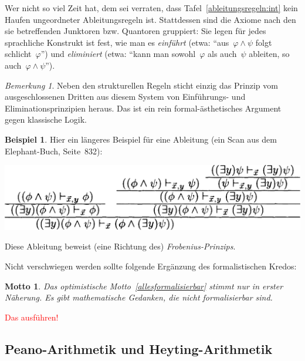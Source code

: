 \documentclass[a4paper,ngerman,12pt]{scrartcl}
\theoremstyle{definition}
\newtheorem{bsp}[defn]{Beispiel}
\theoremstyle{plain}
\newtheorem{motto}[defn]{Motto}
\theoremstyle{remark}
\newtheorem{bem}[defn]{Bemerkung}
\renewcommand{\_}{\mathpunct{.}\,}
\newcommand{\?}{\,{:}\,}
\newcommand{\XXX}[1]{\textcolor{red}{#1}}
\begin{document}
Wer nicht so viel Zeit hat, dem sei verraten, dass
Tafel~\ref{ableitungsregeln:int} kein Haufen ungeordneter Ableitungsregeln ist.
Stattdessen sind die Axiome nach den sie betreffenden Junktoren bzw. Quantoren
gruppiert: Sie legen für jedes sprachliche Konstrukt ist fest, wie man es
\emph{einführt} (etwa: "`aus~$\varphi \wedge \psi$ folgt schlicht~$\varphi$"')
und \emph{eliminiert} (etwa: "`kann man sowohl~$\varphi$ als auch~$\psi$
ableiten, so auch~$\varphi \wedge \psi$"').

\begin{bem}Neben den strukturellen Regeln sticht einzig das Prinzip vom
ausgeschlossenen Dritten aus diesem System von Einführungs- und
Eliminationsprinzipien heraus. Das ist ein rein formal-ästhetisches Argument
gegen klassische Logik.\end{bem}

\begin{bsp}Hier ein längeres Beispiel für eine Ableitung (ein Scan aus
dem Elephant-Buch, Seite~832):
\begin{center}\includegraphics[scale=0.3]{prooftree-elephant.png}\end{center}
Diese Ableitung beweist (eine Richtung des) \emph{Frobenius-Prinzips}.
\end{bsp}

Nicht verschwiegen werden sollte folgende Ergänzung des formalistischen Kredos:
\begin{motto}Das optimistische Motto~\ref{allesformalisierbar} stimmt nur in
erster Näherung. Es gibt mathematische Gedanken, die nicht formalisierbar
sind.\end{motto}

\XXX{Das ausführen!}


\subsection{Peano-Arithmetik und Heyting-Arithmetik}
\end{document}
